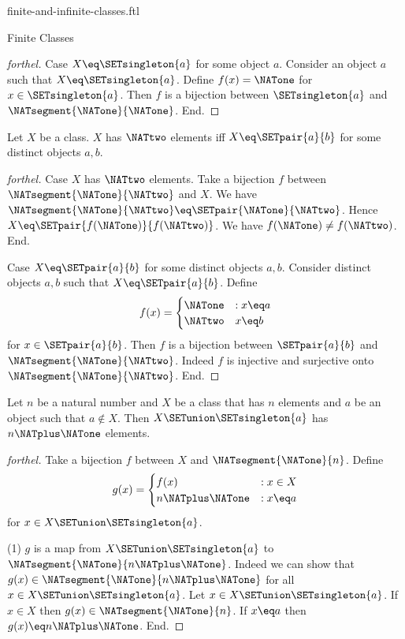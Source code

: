 \documentclass{naproche-library}
\begin{document}
\begin{smodule}[title=Finite and Infinite Classes]{finite-and-infinite-classes.ftl}
\begin{sfragment}{Finite Classes}
\begin{proof}[forthel]
    Case $X \eq \SETsingleton{a}$ for some object $a$.
      Consider an object $a$ such that $X \eq \SETsingleton{a}$.
      Define $f(x) = \NATone$ for $x \in \SETsingleton{a}$.
    Then $f$ is a bijection between $\SETsingleton{a}$ and $\NATsegment{\NATone}{\NATone}$.
    End.
  \end{proof}

  \begin{proposition}[forthel,id=FOUNDATIONS_14_3468912675458910]
    Let $X$ be a class.
    $X$ has $\NATtwo$ elements iff $X \eq \SETpair{a}{b}$ for some distinct objects $a, b$.
  \end{proposition}
  \begin{proof}[forthel]
    Case $X$ has $\NATtwo$ elements.
      Take a bijection $f$ between $\NATsegment{\NATone}{\NATtwo}$ and $X$.
      We have $\NATsegment{\NATone}{\NATtwo} \eq \SETpair{\NATone}{\NATtwo}$.
      Hence $X \eq \SETpair{f(\NATone)}{f(\NATtwo)}$.
      We have $f(\NATone) \neq f(\NATtwo)$.
    End.

    Case $X \eq \SETpair{a}{b}$ for some distinct objects $a, b$.
      Consider distinct objects $a, b$ such that $X \eq \SETpair{a}{b}$.
      Define \[f(x) =
        \begin{cases}
          \NATone & : x \eq a \\
          \NATtwo & x \eq b
        \end{cases}\]
      for $x \in \SETpair{a}{b}$.
      Then $f$ is a bijection between $\SETpair{a}{b}$ and $\NATsegment{\NATone}{\NATtwo}$.
      Indeed $f$ is injective and surjective onto $\NATsegment{\NATone}{\NATtwo}$.
    End.
  \end{proof}

  \begin{proposition}[forthel,id=FOUNDATIONS_14_0615204230800975]
    Let $n$ be a natural number and $X$ be a class that has $n$ elements and $a$ be an object such that $a \notin X$.
    Then $X \SETunion \SETsingleton{a}$ has $n \NATplus \NATone$ elements.
  \end{proposition}
  \begin{proof}[forthel]
    Take a bijection $f$ between $X$ and $\NATsegment{\NATone}{n}$.
    Define \[g(x) =
      \begin{cases}
        f(x)  & : x \in X \\
        n \NATplus \NATone & : x \eq a
      \end{cases}\]
    for $x \in X \SETunion \SETsingleton{a}$.

    (1) $g$ is a map from $X \SETunion \SETsingleton{a}$ to $\NATsegment{\NATone}{n \NATplus \NATone}$. \newline
    Indeed we can show that $g(x) \in \NATsegment{\NATone}{n \NATplus \NATone}$ for all $x \in X \SETunion \SETsingleton{a}$.
      Let $x \in X \SETunion \SETsingleton{a}$.
      If $x \in X$ then $g(x) \in \NATsegment{\NATone}{n}$.
      If $x \eq a$ then $g(x) \eq n \NATplus \NATone$.
    End.


\end{proof}
\end{sfragment}
\end{smodule}
\end{document}
